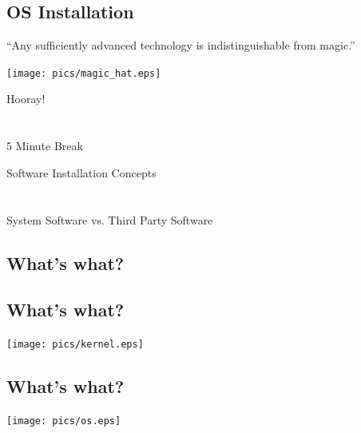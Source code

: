 \documentclass[xga]{xdvislides}
\begin{document}
\subsection{OS Installation}
``Any sufficiently advanced technology is indistinguishable from magic.''
\vspace*{\fill}
\begin{center}
	\texttt{[image: pics/magic\_hat.eps]}
\end{center}
\vspace*{\fill}

\newpage
\vspace*{\fill}
\begin{center}
    \Hugesize
        Hooray! \\ [1em]
    \hspace*{5mm}
    \blueline\\
    \hspace*{5mm}\\
        5 Minute Break
\end{center}
\vspace*{\fill}

\newpage
\vspace*{\fill}
\begin{center}
	\Hugesize
		Software Installation Concepts \\ [1em]
	\hspace*{5mm}
	\blueline\\
	\hspace*{5mm}\\
		System Software vs. Third Party Software
\end{center}
\vspace*{\fill}

\subsection{What's what?}
\subsection{What's what?}
\begin{center}
	\texttt{[image: pics/kernel.eps]}
\end{center}


\subsection{What's what?}
\begin{center}
	\texttt{[image: pics/os.eps]}
\end{center}
\end{document}
